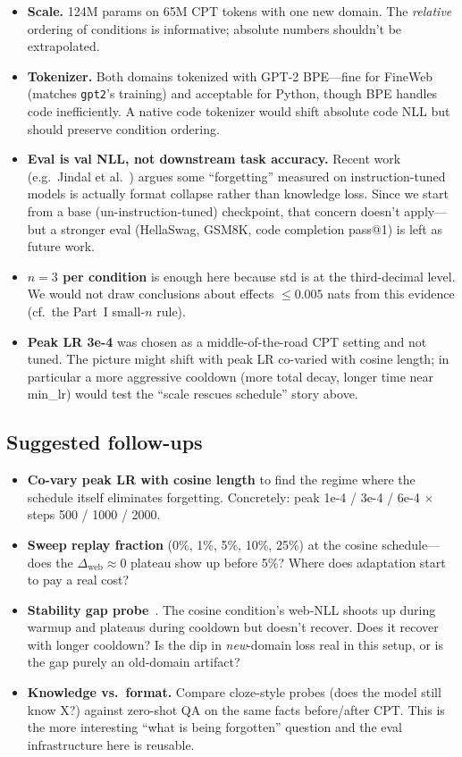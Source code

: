 \documentclass[10pt,letterpaper]{article}
\newcommand{\code}[1]{\texttt{\small #1}}
\begin{document}
\begin{itemize}[leftmargin=1.4em,itemsep=2pt]
  \item \textbf{Scale.} 124M params on 65M CPT tokens with one new domain. The \emph{relative} ordering of conditions is informative; absolute numbers shouldn't be extrapolated.
  \item \textbf{Tokenizer.} Both domains tokenized with GPT-2 BPE---fine for FineWeb (matches \code{gpt2}'s training) and acceptable for Python, though BPE handles code inefficiently. A native code tokenizer would shift absolute code NLL but should preserve condition ordering.
  \item \textbf{Eval is val NLL, not downstream task accuracy.} Recent work (e.g.\ Jindal et al.~\cite{jindal_format}) argues some ``forgetting'' measured on instruction-tuned models is actually format collapse rather than knowledge loss. Since we start from a base (un-instruction-tuned) checkpoint, that concern doesn't apply---but a stronger eval (HellaSwag, GSM8K, code completion pass@1) is left as future work.
  \item \textbf{$n=3$ per condition} is enough here because std is at the third-decimal level. We would not draw conclusions about effects $\leq 0.005$ nats from this evidence (cf.\ the Part~I small-$n$ rule).
  \item \textbf{Peak LR 3e-4} was chosen as a middle-of-the-road CPT setting and not tuned. The picture might shift with peak LR co-varied with cosine length; in particular a more aggressive cooldown (more total decay, longer time near min\_lr) would test the ``scale rescues schedule'' story above.
\end{itemize}

\subsection{Suggested follow-ups}
\label{sec:cpt-followups}

\begin{itemize}[leftmargin=1.4em,itemsep=2pt]
  \item \textbf{Co-vary peak LR with cosine length} to find the regime where the schedule itself eliminates forgetting. Concretely: peak 1e-4 / 3e-4 / 6e-4 $\times$ steps 500 / 1000 / 2000.
  \item \textbf{Sweep replay fraction} (0\%, 1\%, 5\%, 10\%, 25\%) at the cosine schedule---does the $\Delta_{\text{web}} \approx 0$ plateau show up before 5\%? Where does adaptation start to pay a real cost?
  \item \textbf{Stability gap probe}~\cite{guo_stability_gap}. The cosine condition's web-NLL shoots up during warmup and plateaus during cooldown but doesn't recover. Does it recover with longer cooldown? Is the dip in \emph{new}-domain loss real in this setup, or is the gap purely an old-domain artifact?
  \item \textbf{Knowledge vs.\ format.} Compare cloze-style probes (does the model still know X?) against zero-shot QA on the same facts before/after CPT. This is the more interesting ``what is being forgotten'' question and the eval infrastructure here is reusable.
\end{itemize}
\end{document}
